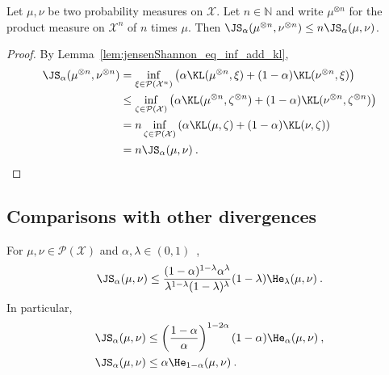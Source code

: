 \begin{lemma}
  \label{lem:jensenShannon_prod_n}
  Let $\mu, \nu$ be two probability measures on $\mathcal X$. Let $n \in \mathbb{N}$ and write $\mu^{\otimes n}$ for the product measure on $\mathcal X^n$ of $n$ times $\mu$.
  Then $\JS_\alpha(\mu^{\otimes n}, \nu^{\otimes n}) \le n \JS_\alpha(\mu, \nu)$.
\end{lemma}

\begin{proof}%
{}
By Lemma~\ref{lem:jensenShannon_eq_inf_add_kl},
\begin{align*}
\JS_\alpha(\mu^{\otimes n}, \nu^{\otimes n})
&= \inf_{\xi \in \mathcal P(\mathcal X^n)}\left( \alpha \KL(\mu^{\otimes n}, \xi) + (1 - \alpha)\KL(\nu^{\otimes n}, \xi) \right)
\\
&\le \inf_{\zeta \in \mathcal P(\mathcal X)}\left( \alpha \KL(\mu^{\otimes n}, \zeta^{\otimes n}) + (1 - \alpha)\KL(\nu^{\otimes n}, \zeta^{\otimes n}) \right)
\\
&= n \inf_{\zeta \in \mathcal P(\mathcal X)}\left( \alpha \KL(\mu, \zeta) + (1 - \alpha)\KL(\nu, \zeta) \right)
\\
&= n \JS_\alpha(\mu, \nu)
\: .
\end{align*}

\end{proof}



\subsection{Comparisons with other divergences}

\begin{lemma}
  \label{lem:jensenShannon_le_hellingerAlpha}
  For $\mu, \nu \in \mathcal P(\mathcal X)$ and $\alpha, \lambda \in (0,1)$~,
  \begin{align*}
  \JS_\alpha(\mu, \nu) \le \frac{(1 - \alpha)^{1 - \lambda} \alpha^\lambda}{\lambda^{1 - \lambda} (1 - \lambda)^\lambda} (1 - \lambda)\He_\lambda(\mu, \nu) \: .
  \end{align*}
  In particular,
  \begin{align*}
  \JS_\alpha(\mu, \nu)
  &\le \left(\frac{1 - \alpha}{\alpha}\right)^{1 - 2 \alpha} (1 - \alpha)\He_\alpha(\mu, \nu)
  \: , \\
  \JS_\alpha(\mu, \nu)
  &\le \alpha \He_{1 - \alpha}(\mu, \nu)
  \: .
  \end{align*}
\end{lemma}

